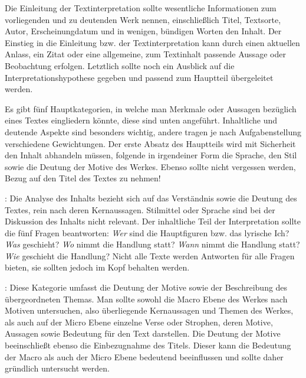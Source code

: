 \begin{enumerate}

	Die Einleitung der Textinterpretation sollte wesentliche Informationen zum vorliegenden und zu deutenden Werk nennen, einschlie\ss{}lich Titel, Textsorte, Autor, Erscheinungdatum und in wenigen, b\"{u}ndigen Worten den Inhalt. Der Einstieg in die Einleitung bzw. der Textinterpretation kann durch einen aktuellen Anlass, ein Zitat oder eine allgemeine, zum Textinhalt passende Aussage oder Beobachtung erfolgen. Letztlich sollte noch ein Ausblick auf die Interpretationshypothese gegeben und passend zum Hauptteil \"{u}bergeleitet werden.


	Es gibt f\"{u}nf Hauptkategorien, in welche man Merkmale oder Aussagen bez\"{u}glich eines Textes eingliedern k\"{o}nnte, diese sind unten angef\"{u}hrt. Inhaltliche und deutende Aspekte sind besonders wichtig, andere tragen je nach Aufgabenstellung verschiedene Gewichtungen. Der erste Absatz des Hauptteils wird mit Sicherheit den Inhalt abhandeln m\"{u}ssen, folgende in irgendeiner Form die Sprache, den Stil sowie die Deutung der Motive des Werkes. Ebenso sollte nicht vergessen werden, Bezug auf den Titel des Textes zu nehmen!

		\begin{itemize}
			: Die Analyse des Inhalts bezieht sich auf das Verst\"{a}ndnis sowie die Deutung des Textes, rein nach deren Kernaussagen. Stilmittel oder Sprache sind bei der Diskussion des Inhalts nicht relevant. Der inhaltliche Teil der Interpretation sollte die f\"{u}nf  Fragen beantworten: \emph{Wer} sind die Hauptfiguren bzw. das lyrische Ich? \emph{Was} geschieht? \emph{Wo} nimmt die Handlung statt? \emph{Wann} nimmt die Handlung statt? \emph{Wie} geschieht die Handlung? Nicht alle Texte werden Antworten f\"{u}r alle Fragen bieten, sie sollten jedoch im Kopf behalten werden.

			: Diese Kategorie umfasst die Deutung der Motive sowie der Beschreibung des \"{u}bergeordneten Themas. Man sollte sowohl die Macro Ebene des Werkes nach Motiven untersuchen, also \"{u}berliegende Kernaussagen und Themen des Werkes, als auch auf der Micro Ebene einzelne Verse oder Strophen, deren Motive, Aussagen sowie Bedeutung f\"{u}r den Text darstellen. Die Deutung der Motive beeinschlie\ss{}t ebenso die Einbezugnahme des Titels. Dieser kann die Bedeutung der Macro als auch der Micro Ebene bedeutend beeinflussen und sollte daher gr\"{u}ndlich untersucht werden.


\end{itemize}
\end{enumerate}
